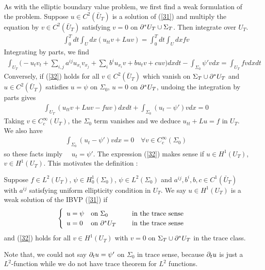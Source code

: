 \documentclass[12pt,a4paper]{report}
\begin{document}
As with the elliptic boundary value problem, we first find a weak formulation of the problem. Suppose $u\in C^2(\bar{U}_T)$ is a solution of (\ref{31}) and multiply the equation by $v\in C^2(\bar{U}_T)$ satisfying $v=0$ on $\partial^* U_T \cup \Sigma_T$. Then integrate over $U_T$.
\begin{align*}
\int_0^T dt \int_U dx (u_{tt} v + Luv) = \int_0^T dt \int_U dx fv
\end{align*}
Integrating by parts, we find
\begin{align}
\int_{U_T} \Big( -u_t v_t + \sum_{i,j} a^{ij}u_{x_i} v_{x_j} + \sum_i b^i u_{x_i} v + bu_t v  + cuv \Big) dxdt - \int_{\Sigma_0} \psi' v dx = \int_{U_T} fv dx dt \label{32}
\end{align}
Conversely, if (\ref{32}) holds for all $v\in C^2(\bar{U}_T)$ which vanish on $\Sigma_T \cup \partial^* U_T$ and $u\in C^2(\bar{U}_T)$ satisfies $u= \psi$ on $\Sigma_0$, $u=0$ on $\partial^* U_T$, undoing the integration by parts gives
\begin{align*}
\int_{U_T} (u_{tt}v + Luv - fuv) dxdt + \int_{\Sigma_0} (u_t - \psi') vdx =0
\end{align*}
Taking $v\in C_c^{\infty}(U_T)$, the $\Sigma_0$ term vanishes and we deduce $u_{tt} + Lu = f$ in $U_T$. We also have
\begin{align*}
\int_{\Sigma_0} (u_t - \psi') vdx =0 \quad \forall v \in C_c^{\infty}(\Sigma_0)
\end{align*}
so these facts imply $\quad u_t = \psi'$. The expression (\ref{32}) makes sense if $u\in H^1(U_T)$, $v\in H^1(U_T)$. This motivates the definition :
\s

 Suppose $f\in L^2(U_T)$, $\psi \in H_0^1(\Sigma_0)$, $\psi \in L^2(\Sigma_0)$ and $a^{ij}, b^i, b, c \in C^1(\bar{U}_T)$ with $a^{ij}$ satisfying uniform ellipticity condition in $U_T$. We say $u\in H^1(U_T)$ is a weak solution of the IBVP (\ref{31}) if
\begin{align*}
\begin{cases}
\begin{array}{lll}
u = \psi & \text{on } \Sigma_0 & \quad \text{ in the trace sense} \\
u = 0 & \text{on } \partial^* U_T & \quad \text{ in the trace sense}
\end{array}
\end{cases}
\end{align*}
and (\ref{32}) holds for all $v\in H^1(U_T)$ with $v=0$ on $\Sigma_T \cup \partial^* U_T$ in the trace class.
\s

Note that, we could not say $\partial_t u = \psi'$ on $\Sigma_0$ in trace sense, because $\partial_t u$ is just a $L^2$-function while we do not have trace theorem for $L^2$ functions.
\s
\end{document}
